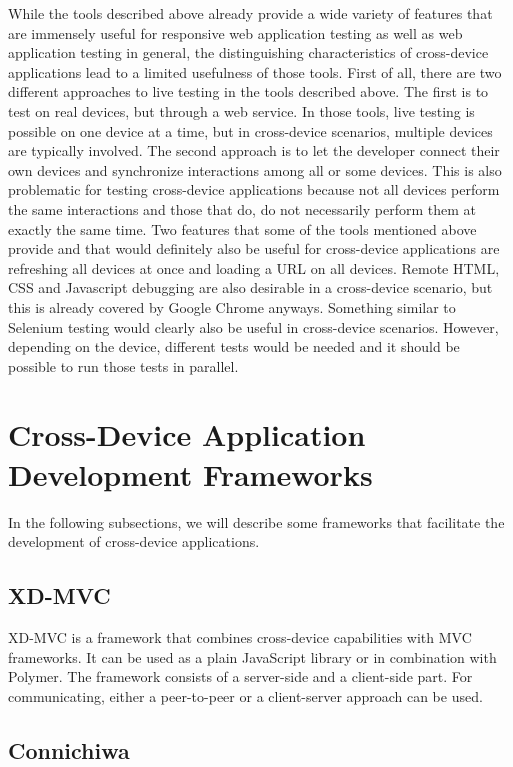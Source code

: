While the tools described above already provide a wide variety of features that are immensely useful for responsive web application testing as well as web application testing in general, the distinguishing characteristics of cross-device applications lead to a limited usefulness of those tools. First of all, there are two different approaches to live testing in the tools described above. The first is to test on real devices, but through a web service. In those tools, live testing is possible on one device at a time, but in cross-device scenarios, multiple devices are typically involved. The second approach is to let the developer connect their own devices and synchronize interactions among all or some devices. This is also problematic for testing cross-device applications because not all devices perform the same interactions and those that do, do not necessarily perform them at exactly the same time. Two features that some of the tools mentioned above provide and that would definitely also be useful for cross-device applications are refreshing all devices at once and loading a URL on all devices. Remote HTML, CSS and Javascript debugging are also desirable in a cross-device scenario, but this is already covered by Google Chrome anyways. Something similar to Selenium testing would clearly also be useful in cross-device scenarios. However, depending on the device, different tests would be needed and it should be possible to run those tests in parallel.

\section{Cross-Device Application Development Frameworks}

In the following subsections, we will describe some frameworks that facilitate the development of cross-device applications.

\subsection{XD-MVC}

XD-MVC is a framework that combines cross-device capabilities with MVC frameworks. It can be used as a plain JavaScript library or in combination with Polymer. The framework consists of a server-side and a client-side part. For communicating, either a peer-to-peer or a client-server approach can be used.

\subsection{Connichiwa}

